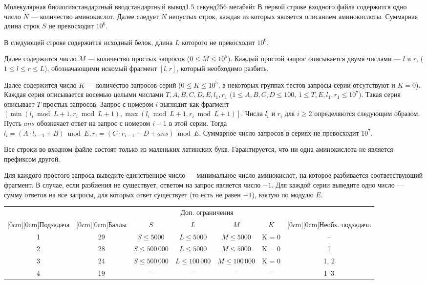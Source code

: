 \begin{problem}{Молекулярная биология}{стандартный ввод}{стандартный вывод}{1.5 секунд}{256 мегабайт}
\InputFile
В первой строке входного файла содержится одно число $N$ --- количество аминокислот. Далее следует $N$ непустых строк, каждая из которых является описанием аминокислоты. Суммарная длина строк $S$ не превосходит $10^6$.

В следующей строке содержится исходный белок, длина $L$ которого не превосходит $10^6$.

Далее содержится число $M$ --- количество простых запросов ($0 \leqslant M \leqslant 10^5$). Каждый простой запрос описывается двумя числами --- $l$ и $r$, ($1 \leqslant l \leqslant r \leqslant L$), обозначающими искомый фрагмент $[l, r]$, который необходимо разбить.

Далее содержится число $K$ --- количество запросов-серий ($0 \leqslant K \leqslant 10^5$, в некоторых группах тестов запросы-серии отсутствуют и $K=0$). Каждая серия описывается восемью целыми числами $T, A, B, C, D, E, l_1, r_1$ ($1 \leqslant A, B, C, D \leqslant 100$, $1 \leqslant T, E, l_1, r_1 \leqslant 10^7$). Такая серия описывает $T$ простых запросов. Запрос с номером $i$ выглядит как фрагмент $[\min(l_i \bmod L + 1, r_i \bmod L + 1), \max(l_i \bmod L + 1, r_i \bmod L + 1)]$. Числа $l_i$ и $r_i$ для $i \geqslant 2$ определяются следующим образом. Пусть $ans$ обозначает ответ на запрос с номером $i-1$ в этой серии. Тогда $l_i = (A \cdot l_{i-1} + B) \bmod E, r_i = (C \cdot r_{i-1} + D + ans) \bmod E$. Суммарное число запросов в сериях не превосходит $10^7$.

Все строки во входном файле состоят только из маленьких латинских букв. Гарантируется, что ни одна аминокислота не является префиксом другой.

\OutputFile
Для каждого простого запроса выведите единственное число --- минимальное число аминокислот, на которое разбивается соответствующий фрагмент. В случае, если разбиения не существует, ответом на запрос является число $-1$. Для каждой серии выведите одно число --- сумму ответов на все запросы, для которых ответ существует (то есть не равен $-1$), взятую по модулю $E$.

\Scoring
\begin{center}
\renewcommand{\arraystretch}{1.5}
\begin{tabular}{|c|c|c|c|c|c|c|}
\hline
& & \multicolumn{4}{c|}{Доп. ограничения} & \\
\cline{3-6}
\raisebox{2.25ex}[0cm][0cm]{Подзадача}
& \raisebox{2.25ex}[0cm][0cm]{Баллы}
& $S$ & $L$ & $M$ & $K$ 
& \raisebox{2.25ex}[0cm][0cm]{\parbox{2cm}{\centering Необх. подзадачи}} 
\\ \hline
1  & 29 & $S \leq 5000$     & $L \leq 5000$     & $M \leq 5000$     & K = 0 & --    \\  \hline
2  & 28 & $S \leq 500\,000$ & $L \leq 5000$     & $M \leq 5000$     & K = 0 & 1     \\  \hline
3  & 24 & $S \leq 500\,000$ & $L \leq 100\,000$ & $M \leq 100\,000$ & K = 0 & 1, 2  \\  \hline
4  & 19 & -- & -- & -- & -- & 1--3 \\  \hline
\end{tabular}
\end{center}


\end{problem}
